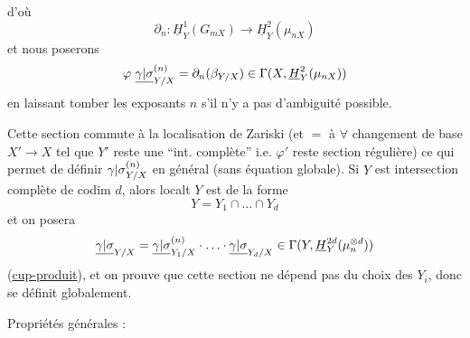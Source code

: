 
d'où
\[
\partial_n:\underline H_Y^1(G_{mX})\longrightarrow\underline H_Y^2(\mu_{nX})
\]
et nous poserons
\[
\deleted{\unsure{\varphi}}\ 
\underline{\unsure{\gamma|\sigma}}_{Y/X}^{(n)}
=\partial_n(\unsure{\beta_{Y/X}})
\in\Gamma(X,\underline H_Y^2(\mu_{nX}))
\]
en laissant tomber les exposants $n$
s'il n'y a pas d'ambiguité possible.

Cette section  commute à la localisation
de Zariski (et $=$ à $\forall$ changement de base
$X'\longrightarrow X$ tel que $Y'$ reste une ``int. complète''
i.e. $\varphi'$ reste section régulière) ce qui
permet de définir ${\gamma|\sigma}_{Y/X}^{(n)}$ en général
(sans équation globale). Si \inserted{maintenant} $Y$ est intersection
complète de codim $d$, alors localt $Y$ est
de la forme
\[
Y=Y_1\cap\ldots\cap Y_d
\]
et on posera
\[
\underline{{\gamma|\sigma}}_{Y/X}
=\underline{{\gamma|\sigma}}_{Y_1/X}^{{{(n)}}}
\cdot\ldots\cdot\underline{{\gamma|\sigma}}_{Y_d/X}
\in\Gamma(Y,\underline H_Y^{2d}(\mu_n^{\otimes d}))
\]
(\uline{cup-produit}), et on prouve que cette
section ne dépend pas du choix des $Y_i$,
donc se définit globalement.

Propriétés générales :

